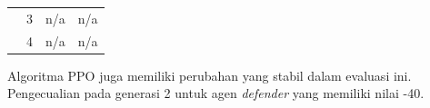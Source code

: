 \begin{table}[H]
\begin{tabular}{|c|c|c|c|}
    & 3                                                                            & n/a                                                                              & n/a                                                                              \\ \cline{2-4} 
    & 4                                                                            & n/a                                                                              & n/a                                                                              \\ \hline
  \end{tabular}
\end{table}

Algoritma PPO juga memiliki perubahan yang stabil dalam evaluasi ini.
Pengecualian pada generasi 2 untuk agen \emph{defender} yang memiliki nilai -40.

